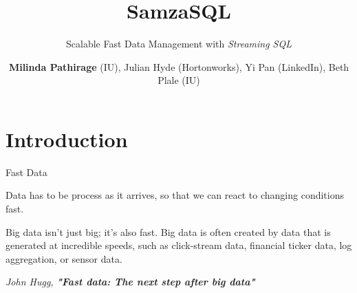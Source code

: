\documentclass[newPxFont]{beamer}
\title{SamzaSQL}
\subtitle{Scalable Fast Data Management with \textit{Streaming SQL}}
\author{\textbf{Milinda Pathirage} (IU), Julian Hyde (Hortonworks), Yi Pan (LinkedIn), Beth Plale (IU)}
\institute{School of Informatics and Computing, Indiana University}
\begin{document}

%
%

\maketitle


%
%

\section*{Introduction}


\begin{frame}[c]{Fast Data}

Data has to be process as it arrives, so that we can react to changing conditions fast. 

\vspace{1em}

\begin{exampleblock}{Big data isn't just big; it's also fast.}
Big data is often created by data that is generated at incredible speeds, such as click-stream data, financial ticker data, log aggregation, or sensor data. 
\end{exampleblock}
\vspace{-1.5em}
\begin{flushright}
\tiny\textit{John Hugg, \textbf{"Fast data: The next step after big data"}}
\end{flushright}

\end{frame}

\end{document}
